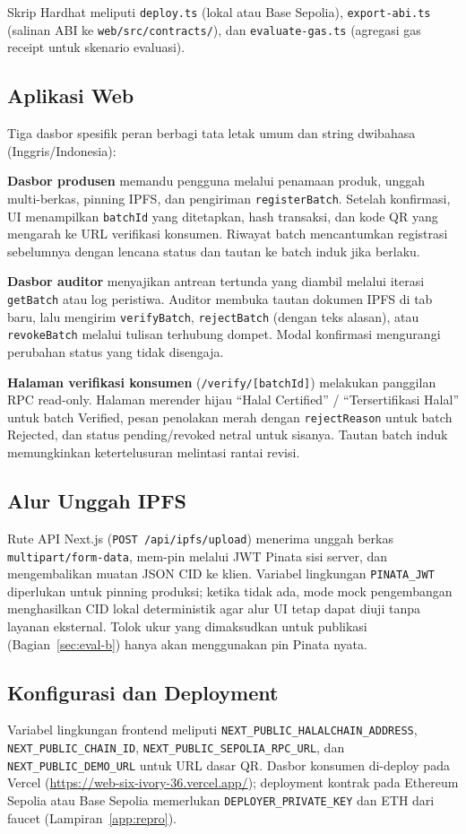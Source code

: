 Skrip Hardhat meliputi \texttt{deploy.ts} (lokal atau Base Sepolia), \texttt{export-abi.ts} (salinan ABI ke \texttt{web/src/contracts/}), dan \texttt{evaluate-gas.ts} (agregasi gas receipt untuk skenario evaluasi).

\subsection{Aplikasi Web}
Tiga dasbor spesifik peran berbagi tata letak umum dan string dwibahasa (Inggris/Indonesia):

\textbf{Dasbor produsen} memandu pengguna melalui penamaan produk, unggah multi-berkas, pinning IPFS, dan pengiriman \texttt{registerBatch}.
Setelah konfirmasi, UI menampilkan \texttt{batchId} yang ditetapkan, hash transaksi, dan kode QR yang mengarah ke URL verifikasi konsumen.
Riwayat batch mencantumkan registrasi sebelumnya dengan lencana status dan tautan ke batch induk jika berlaku.

\textbf{Dasbor auditor} menyajikan antrean tertunda yang diambil melalui iterasi \texttt{getBatch} atau log peristiwa.
Auditor membuka tautan dokumen IPFS di tab baru, lalu mengirim \texttt{verifyBatch}, \texttt{rejectBatch} (dengan teks alasan), atau \texttt{revokeBatch} melalui tulisan terhubung dompet.
Modal konfirmasi mengurangi perubahan status yang tidak disengaja.

\textbf{Halaman verifikasi konsumen} (\texttt{/verify/[batchId]}) melakukan panggilan RPC read-only.
Halaman merender hijau ``Halal Certified'' / ``Tersertifikasi Halal'' untuk batch Verified, pesan penolakan merah dengan \texttt{rejectReason} untuk batch Rejected, dan status pending/revoked netral untuk sisanya.
Tautan batch induk memungkinkan ketertelusuran melintasi rantai revisi.

\subsection{Alur Unggah IPFS}
Rute API Next.js (\texttt{POST /api/ipfs/upload}) menerima unggah berkas \texttt{multipart/form-data}, mem-pin melalui JWT Pinata sisi server, dan mengembalikan muatan JSON CID ke klien.
Variabel lingkungan \texttt{PINATA\_JWT} diperlukan untuk pinning produksi; ketika tidak ada, mode mock pengembangan menghasilkan CID lokal deterministik agar alur UI tetap dapat diuji tanpa layanan eksternal.
Tolok ukur yang dimaksudkan untuk publikasi (Bagian~\ref{sec:eval-b}) hanya akan menggunakan pin Pinata nyata.

\subsection{Konfigurasi dan Deployment}
Variabel lingkungan frontend meliputi \texttt{NEXT\_PUBLIC\_HALALCHAIN\_ADDRESS}, \texttt{NEXT\_PUBLIC\_CHAIN\_ID}, \texttt{NEXT\_PUBLIC\_SEPOLIA\_RPC\_URL}, dan \texttt{NEXT\_PUBLIC\_DEMO\_URL} untuk URL dasar QR.
Dasbor konsumen di-deploy pada Vercel (\url{https://web-six-ivory-36.vercel.app/}); deployment kontrak pada Ethereum Sepolia atau Base Sepolia memerlukan \texttt{DEPLOYER\_PRIVATE\_KEY} dan ETH dari faucet (Lampiran~\ref{app:repro}).
